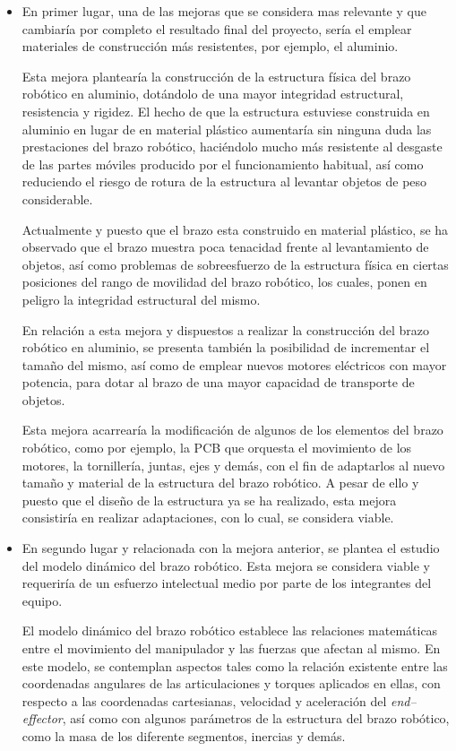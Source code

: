 \begin{itemize}
    \item En primer lugar, una de las mejoras que se considera mas relevante y que cambiaría por completo el resultado final del proyecto, sería el emplear materiales de construcción más resistentes, por ejemplo, el aluminio.
    
    Esta mejora plantearía la construcción de la estructura física del brazo robótico en aluminio, dotándolo de una mayor integridad estructural, resistencia y rigidez. El hecho de que la estructura estuviese construida en aluminio en lugar de en material plástico aumentaría sin ninguna duda las prestaciones del brazo robótico, haciéndolo mucho más resistente al desgaste de las partes móviles producido por el funcionamiento habitual, así como reduciendo el riesgo de rotura de la estructura al levantar objetos de peso considerable.
    
    Actualmente y puesto que el brazo esta construido en material plástico, se ha observado que el brazo muestra poca tenacidad frente al levantamiento de objetos, así como problemas de sobreesfuerzo de la estructura física en ciertas posiciones del rango de movilidad del brazo robótico, los cuales, ponen en peligro la integridad estructural del mismo.
    
    En relación a esta mejora y dispuestos a realizar la construcción del brazo robótico en aluminio, se presenta también la posibilidad de incrementar el tamaño del mismo, así como de emplear nuevos motores eléctricos con mayor potencia, para dotar al brazo de una mayor capacidad de transporte de objetos.
    
    Esta mejora acarrearía la modificación de algunos de los elementos del brazo robótico, como por ejemplo, la PCB que orquesta el movimiento de los motores, la tornillería, juntas, ejes y demás, con el fin de adaptarlos al nuevo tamaño y material de la estructura del brazo robótico. A pesar de ello y puesto que el diseño de la estructura ya se ha realizado, esta mejora consistiría en realizar adaptaciones, con lo cual, se considera viable.
    
    \item En segundo lugar y relacionada con la mejora anterior, se plantea el estudio del modelo dinámico del brazo robótico. Esta mejora se considera viable y requeriría de un esfuerzo intelectual medio por parte de los integrantes del equipo.
    
    El modelo dinámico del brazo robótico establece las relaciones matemáticas entre el movimiento del manipulador y las fuerzas que afectan al mismo. En este modelo, se contemplan aspectos tales como la relación existente entre las coordenadas angulares de las articulaciones y torques aplicados en ellas, con respecto a las coordenadas cartesianas, velocidad y aceleración del \textit{end--effector}, así como con algunos parámetros de la estructura del brazo robótico, como la masa de los diferente segmentos, inercias y demás.
    

\end{itemize}
